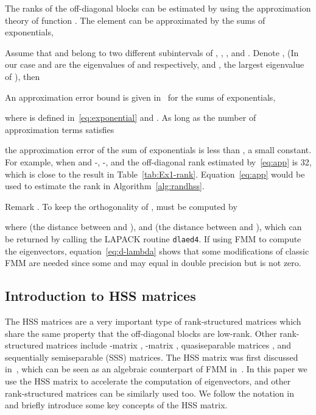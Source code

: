 \documentclass[times]{nlaauth}
\newcounter{remark}
\newenvironment{remark}{\refstepcounter{remark}\vspace{1ex}
{\sc Remark \theremark.}\hspace{0.3em}\parindent=0pt}{\vspace{1ex}}
\begin{document}
The ranks of the off-diagonal blocks can be estimated by using the
approximation theory of function .
The element  can be approximated by the sums of exponentials,

Assume that  and  belong to two different subintervals of , , ,  and .
Denote , (In our case  and 
are the eigenvalues of  and  respectively,  and , the largest eigenvalue of ), then

An approximation error bound is given in~\cite{hackbusch-exp} for the sums of exponentials,

where  is defined in~\eqref{eq:exponential} and .
As long as the number of approximation terms satisfies

the approximation error of the sum of exponentials is less than , a small constant.
For example, when  and -, -,  and
the off-diagonal rank estimated by~\eqref{eq:app} is 32, which is close to the result in
Table~\ref{tab:Ex1-rank}.
Equation~\eqref{eq:app} would be used to estimate the rank in Algorithm~\ref{alg:randhss}.

\begin{remark}
To keep the orthogonality of  ,  must be computed by

where  (the distance between  and ),
and  (the distance between  and ),
which can be returned by calling the LAPACK routine \texttt{dlaed4}.
If using FMM to compute the eigenvectors, equation~\eqref{eq:d-lambda} shows that some modifications of classic FMM are needed
since some  and  may equal in double precision but
 is not zero.

\end{remark}

\subsection{Introduction to HSS matrices}
\label{sec:hss}

The HSS matrices are a very important type of rank-structured matrices
which share the same property that the off-diagonal blocks are low-rank.
Other rank-structured matrices include  -matrix \cite{Hackbusch1999,Hackbusch2000},
-matrix \cite{Hackbusch-Sauter2000,Hackbusch-Borm2002},
quasiseparable matrices \cite{Eidelman-Gohberg1999, Vandebril-book1}, and sequentially
semiseparable (SSS) \cite{Chandrasekaran03,ChandrasekaranGu05} matrices.
The HSS matrix was first discussed in~\cite{ChandrasekaranGu04,Hss-ulv}, which can be seen as
an algebraic counterpart of FMM in~\cite{Starr-thesis}.
In this paper we use the HSS matrix to accelerate the computation of eigenvectors,
and other rank-structured matrices can be similarly used too.
We follow the notation in~\cite{Xia-Fast09,Xia-HSS-Chol} and briefly introduce some key concepts of
the HSS matrix.
\end{document}
